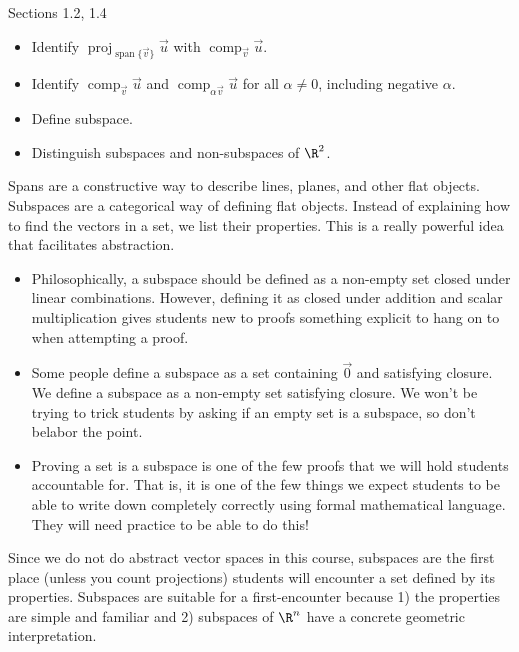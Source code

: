 \documentclass{problemset}
\DeclareMathOperator{\Span}{span}
\DeclareMathOperator{\Comp}{comp}
\DeclareMathOperator{\Proj}{proj}
\begin{document}
\begin{lesson}

	Sections 1.2, 1.4

	\begin{itemize}
		\item Identify $\Proj_{\Span\{\vec v\}}\vec u$ with $\Comp_{\vec v}\vec u$.
		\item Identify $\Comp_{\vec v}\vec u$ and $\Comp_{\alpha\vec v}\vec u$
			for all $\alpha\neq 0$, including negative $\alpha$.
		\item Define subspace.
		\item Distinguish subspaces and non-subspaces of $\R^2$.
	\end{itemize}

	Spans are a constructive way to describe lines, planes, and other
	flat objects. Subspaces are a categorical way of defining flat objects.
	Instead of explaining how to find the vectors in a set, we list their
	properties. This is a really powerful idea that facilitates abstraction.

	\begin{annotation}
		\begin{notes}
			\begin{itemize}
			\item	Philosophically, a subspace should be defined
			as a non-empty set closed under linear combinations.
			However, defining it as closed under addition and scalar
			multiplication gives students new to proofs
			something explicit to hang on to when attempting a proof.
			\item Some people define a subspace as a set containing
			$\vec 0$ and satisfying closure. We define a subspace
			as a non-empty set satisfying closure. We won't be trying
			to trick students by asking if an empty set is a subspace,
			so don't belabor the point.
			\item Proving a set is a subspace is one of the few proofs
				that we will hold students accountable for. That is,
					it is one of the few things we expect
					students to be able to write down completely
					correctly using formal mathematical language.
					They will need practice to be able to do this!
			\end{itemize}
		\end{notes}
	\end{annotation}
	Since we do not do abstract vector spaces in this course, subspaces are
	the first place (unless you count projections) students will encounter
	a set defined by its properties. Subspaces are suitable for a first-encounter
	because 1) the properties are simple and familiar and 2) subspaces of $\R^n$
	have a concrete geometric interpretation.

\end{lesson}
\end{document}
